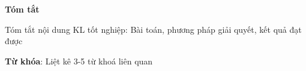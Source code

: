 \begin{center}
\textbf{\large{Tóm tắt}	}
\end{center}


\begin{small}

Tóm tắt nội dung KL tốt nghiệp: Bài toán, phương pháp giải quyết, kết quả đạt được


\vspace*{1cm}
\textbf{Từ khóa}: Liệt kê 3-5 từ khoá liên quan

\end{small}
